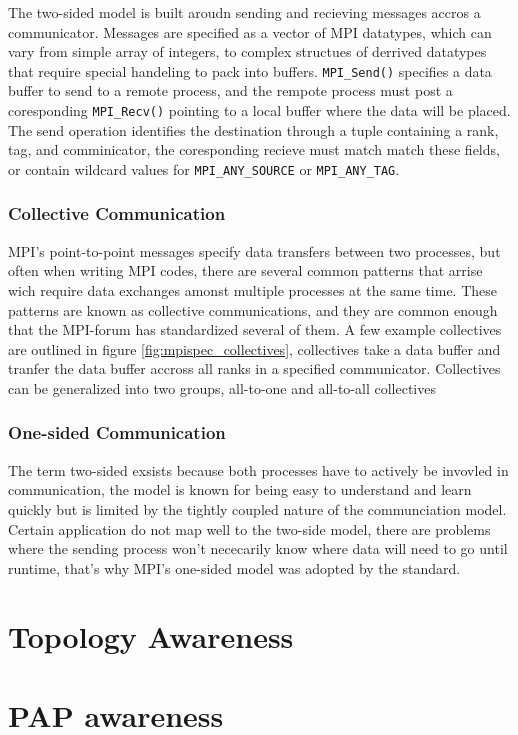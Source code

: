 The two-sided model is built aroudn sending and recieving messages accros a communicator.
Messages are specified as a vector of MPI datatypes, which can vary from simple array of integers, to complex structues of derrived datatypes that require special handeling to pack into buffers. 
\texttt{MPI\_Send()} specifies a data buffer to send to a remote process, and the rempote process must post a coresponding \texttt{MPI\_Recv()} pointing to a local buffer where the data will be placed. 
The send operation identifies the destination through a tuple containing a rank, tag, and comminicator, the coresponding recieve must match match these fields, or contain wildcard values for \texttt{MPI\_ANY\_SOURCE} or \texttt{MPI\_ANY\_TAG}.

\subsubsection{Collective Communication}



MPI's point-to-point messages specify data transfers between two processes, but often when writing MPI codes, there are several common patterns that arrise wich require data exchanges amonst multiple processes at the same time.
These patterns are known as collective communications, and they are common enough that the MPI-forum has standardized several of them.
A few example collectives are outlined in figure \ref{fig:mpispec_collectives}, collectives take a data buffer and tranfer the data buffer accross all ranks in a specified communicator.
Collectives can be generalized into two groups, all-to-one and all-to-all collectives



\subsubsection{One-sided Communication}
The term two-sided exsists because both processes have to actively be invovled in communication, the model is known for being easy to understand and learn quickly but is limited by the tightly coupled nature of the communciation model.
Certain application do not map well to the two-side model, there are problems where the sending process won't nececarily know where data will need to go until runtime, that's why MPI's one-sided model was adopted by the standard. 
\section{Topology Awareness}
\section{PAP awareness}

